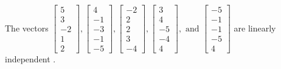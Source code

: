 \begin{exercise}
\begin{exerciseStatement}
  \end{exerciseStatement}
  \begin{exerciseAnswer}
   The vectors \(\left[\begin{array}{r}
5 \\
3 \\
-2 \\
1 \\
2
\end{array}\right] , \left[\begin{array}{r}
4 \\
-1 \\
-3 \\
-1 \\
-5
\end{array}\right] , \left[\begin{array}{r}
-2 \\
2 \\
2 \\
3 \\
-4
\end{array}\right] , \left[\begin{array}{r}
3 \\
4 \\
-5 \\
-4 \\
4
\end{array}\right] , \text{ and } \left[\begin{array}{r}
-5 \\
-1 \\
-1 \\
-5 \\
4
\end{array}\right]\) are 
  	 linearly independent  .
  


  \end{exerciseAnswer}
\end{exercise}